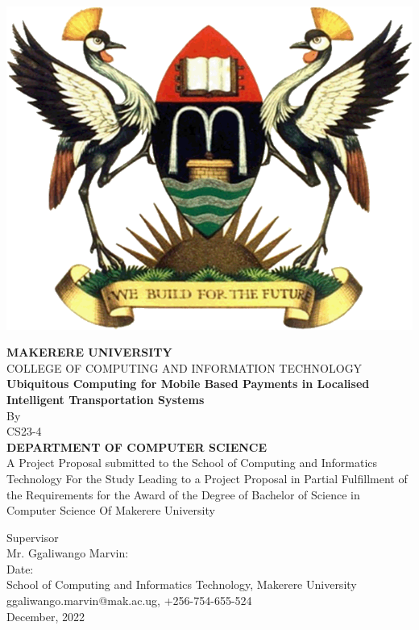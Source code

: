\documentclass[11pt]{report}
\begin{document}
    \begin{titlepage}
        \begin{center}
            \includegraphics[scale=0.25]{images/muk}

            \textbf{MAKERERE UNIVERSITY}
            \\COLLEGE OF COMPUTING AND INFORMATION TECHNOLOGY
            \vspace{1cm}
            \\{\textbf{ Ubiquitous Computing for Mobile Based Payments in Localised Intelligent Transportation Systems}}
            \vspace{0.5cm}
            \\By
            \\CS23-4
            \vspace{0.5cm}
            \\{\textbf{
                DEPARTMENT OF COMPUTER SCIENCE
            }}
            \vspace{0.5cm}
            \\A Project Proposal submitted to the School of Computing and Informatics Technology
            For the Study Leading to a Project Proposal in Partial Fulfillment of the
            Requirements for the Award of the Degree of Bachelor of Science in Computer Science
            Of Makerere University
            \vspace{0.5cm}

            Supervisor
             \vspace{0.2cm}
            \\Mr. Ggaliwango Marvin:\dotfill
             \vspace{0.2cm}
            \\Date:\dotfill
            \vspace{0.2cm}
            \\School of Computing and Informatics Technology, Makerere University
            \\ggaliwango.marvin@mak.ac.ug, +256-754-655-524
            \\December, 2022
        \end{center}
    \end{titlepage}
\end{document}
